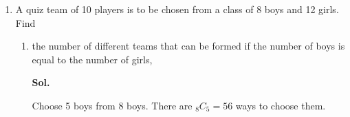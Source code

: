 \documentclass{report}
\newcommand\permtwo[2][^n]{{}_{#1}P_{#2}}
\newcommand\comb[2][^n]{{}_{#1}C_{#2}}
\newcommand{\sol}[1]{

      \noindent \textbf{Sol.}
}
\def\eos{\quad\hbox{\rlap{\hbox{\vrule depth 1.5pt height 2.6mm width 0.2mm \hskip 1mm \vrule height 2.6mm width 0.2mm}}{\vbox{\hrule height 0.2mm width 1.4mm \vskip 2.8mm \hrule depth 1.5pt height -0.35mm width 1.2mm}}}}
\begin{document}
\begin{multicols*}{2}
\begin{enumerate}
\begin{enumerate}
                              There are $(10 - 1)! = 362,880$ ways to seat them. $\eos$

                        \item a particular executive officer must sit between a manager and a worker, \sol{}

                              Choose one manager from 3 managers. There are $\comb[3]{1} = 3$ ways to do so.

                              Choose one worker from 4 workers. There are $\comb[4]{1} = 4$ ways to do so.

                              Treat the executive officer, the manager and the worker as one person.

                              Since the manager and the worker can be seated in any order, there are $2! = 2$
                              ways to do so.

                              There are $(8-1)! = 40,320$ ways to seat the 8 people.

                              Hence, there are $3 \times 4 \times 2 \times 5,040 = 129\,960$ ways to seat
                              them.

                        \item 3 executive officers sit separately.
                              \sol{}

                              First, arrange 3 managers and 4 workers to sit. There are $(7-1)! = 720$ ways
                              to do so.

                              Then, arrange the 3 executive officers to sit in between the managers and the
                              workers. There are $\permtwo[7]{3} = 210$ ways to do so.

                              Hence, there are $720 \times 210 = 151,200$ ways to seat them. $\eos$
                  \end{enumerate}

            \item A quiz team of 10 players is to be chosen from a class of 8 boys and 12 girls.
                  Find
                  \begin{enumerate}
                        \item the number of different teams that can be formed if the number of boys is equal
                              to the number of girls, \sol{}

                              Choose 5 boys from 8 boys. There are $\comb[8]{5} = 56$ ways to choose them.


\end{enumerate}
\end{enumerate}
\end{multicols*}
\end{document}
